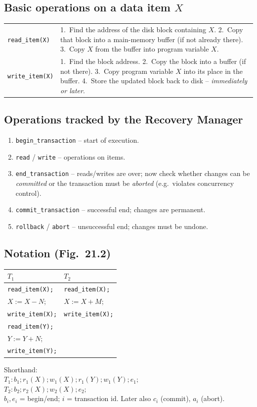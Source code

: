\documentclass[10pt,a4paper]{article}
\newcommand{\op}[1]{\texttt{#1}}
\newcommand{\ri}[2]{r_{#1}(#2)}
\newcommand{\wi}[2]{w_{#1}(#2)}
\begin{document}
\subsection*{Basic operations on a data item $X$}
\begin{tabularx}{\linewidth}{@{}l X@{}}
\toprule
\op{read\_item(X)} & 1.~Find the address of the disk block containing $X$. 2.~Copy that block into a main-memory buffer (if not already there). 3.~Copy $X$ from the buffer into program variable $X$.\\
\op{write\_item(X)} & 1.~Find the block address. 2.~Copy the block into a buffer (if not there). 3.~Copy program variable $X$ into its place in the buffer. 4.~Store the updated block back to disk -- \emph{immediately or later}.\\
\bottomrule
\end{tabularx}

\subsection*{Operations tracked by the Recovery Manager}
\begin{enumerate}
  \item \op{begin\_transaction} -- start of execution.
  \item \op{read} / \op{write} -- operations on items.
  \item \op{end\_transaction} -- reads/writes are over; now check whether changes can be \emph{committed} or the transaction must be \emph{aborted} (e.g.\ violates concurrency control).
  \item \op{commit\_transaction} -- successful end; changes are permanent.
  \item \op{rollback} / \op{abort} -- unsuccessful end; changes must be undone.
\end{enumerate}

\subsection*{Notation (Fig.~21.2)}
\begin{minipage}{0.48\linewidth}
\begin{tabular}{@{}ll@{}}
\toprule
$T_1$ & $T_2$\\\midrule
\op{read\_item(X);} & \op{read\_item(X);}\\
$X := X - N$; & $X := X + M$;\\
\op{write\_item(X);} & \op{write\_item(X);}\\
\op{read\_item(Y);} & \\
$Y := Y + N$; & \\
\op{write\_item(Y);} & \\
\bottomrule
\end{tabular}
\end{minipage}\hfill
\begin{minipage}{0.48\linewidth}
Shorthand:\\
$T_1: b_1; \ri1X; \wi1X; \ri1Y; \wi1Y; e_1;$\\
$T_2: b_2; \ri2X; \wi2X; e_2;$\\[2pt]
$b_i,e_i$ = begin/end; $i$ = transaction id. Later also $c_i$ (commit), $a_i$ (abort).
\end{minipage}
\end{document}
